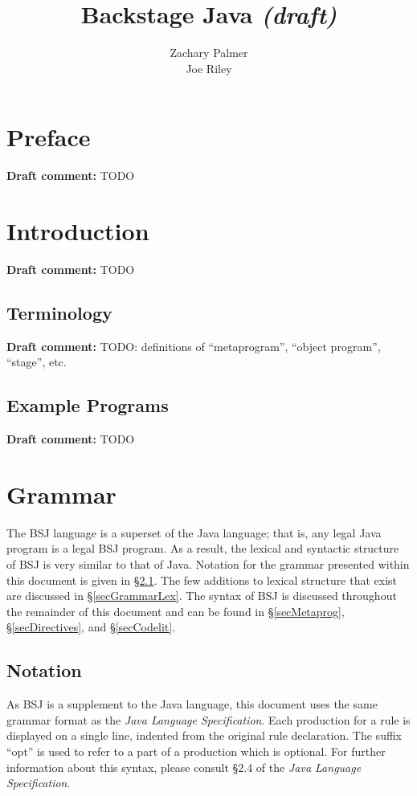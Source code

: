 \documentclass[a4paper,10pt]{report}
\title{Backstage Java \textit{(draft)}}
\author{Zachary Palmer\\Joe Riley}
\newenvironment{draftcomment}{\vspace{0.5cm}\begin{itshape}\textbf{Draft comment: }}{\end{itshape}\vspace{0.5cm}}
\newcommand{\dc}[1]{\begin{draftcomment}#1\end{draftcomment}} %
\newcommand{\refS}[1]{\hyperref[#1]{\S\ref{#1}}}
\newcommand{\BSJ}{BSJ}
\newcommand{\JLS}{\textit{Java Language Specification}}
\begin{document}
\maketitle

\tableofcontents

\chapter*{Preface}
\label{secPreface}

\dc{TODO}

\chapter{Introduction}
\label{secIntro}

\dc{TODO}

\section{Terminology}
\label{secIntroTerms}

\dc{TODO: definitions of ``metaprogram'', ``object program'', ``stage'', etc.}

\section{Example Programs}
\label{secIntroExamples}

\dc{TODO}

\chapter{Grammar}
\label{secGrammar}

The BSJ language is a superset of the Java language; that is, any legal Java program is a legal BSJ program.  As a result, the lexical and syntactic structure of BSJ is very similar to that of Java.  Notation for the grammar presented within this document is given in \refS{secGrammarNotation}.  The few additions to lexical structure that exist are discussed in \refS{secGrammarLex}.  The syntax of BSJ is discussed throughout the remainder of this document and can be found in \refS{secMetaprog}, \refS{secDirectives}, and \refS{secCodelit}.

\section{Notation}
\label{secGrammarNotation}

As \BSJ{} is a supplement to the Java language, this document uses the same grammar format as the \JLS{}.  Each production for a rule is displayed on a single line, indented from the original rule declaration.  The suffix ``opt'' is used to refer to a part of a production which is optional.  For further information about this syntax, please consult \S{}2.4 of the \JLS.
\end{document}
